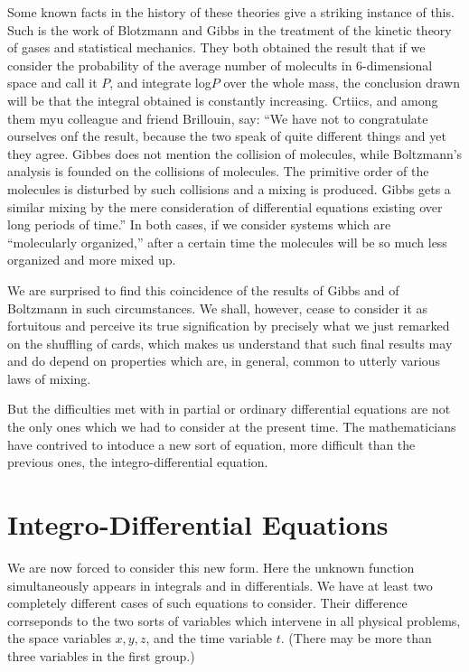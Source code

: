 \documentclass[12pt,oneside]{book}
\begin{document}
Some known facts in the history of these theories give a striking instance of this. Such is the work of Blotzmann and Gibbs in the treatment of the kinetic theory of gases and statistical mechanics. They both obtained the result that if we consider the probability of the average number of molecults in 6-dimensional space and call it $P$, and integrate log$P$ over the whole mass, the conclusion drawn will be that the integral obtained is constantly increasing. Crtiics, and among them myu colleague and friend Brillouin, say: ``We have not to congratulate ourselves onf the result, because the two speak of quite different things and yet they agree. Gibbes does not mention the collision of molecules, while Boltzmann's analysis is founded on the collisions of molecules. The primitive order of the molecules is disturbed by such collisions and a mixing is produced. Gibbs gets a similar mixing by the mere consideration of differential equations existing over long periods of time.'' In both cases, if we consider systems which are ``molecularly organized,'' after a certain time the molecules will be so much less organized and more mixed up. \par 

We are surprised to find this coincidence of the results of Gibbs and of Boltzmann in such circumstances. We shall, however, cease to consider it as fortuitous and perceive its true signification by precisely what we just remarked on the shuffling of cards, which makes us understand that such final results may and do depend on properties which are, in general, common to utterly various laws of mixing. \par 

But the difficulties met with in partial or ordinary differential equations are not the only ones which we had to consider at the present time. The mathematicians have contrived to intoduce a new sort of equation, more difficult than the previous ones, the integro-differential equation. \par 

\section{Integro-Differential Equations}
We are now forced to consider this new form. Here the unknown function simultaneously appears in integrals and in differentials. We have at least two completely different cases of such equations to consider. Their difference corrseponds to the two sorts of variables which intervene in all physical problems, the space variables $x,y,z$, and the time variable $t$. (There may be more than three variables in the first group.) \par 
\end{document}

